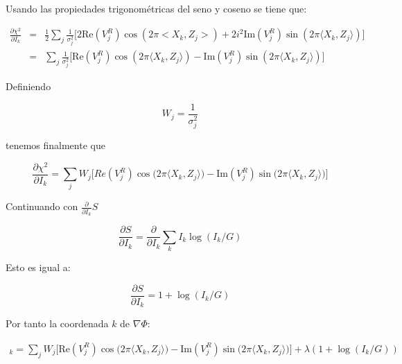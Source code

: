 Usando las propiedades trigonométricas del seno y coseno se tiene que:

\begin{eqnarray}
\frac{\partial\chi^{2}}{\partial I_{k}} & = & \frac{1}{2}\sum\limits_{j}\frac{1}{\sigma_{j}^{2}}\biggl[2\text{Re}(V_{j}^{R})\cos(2\pi <X_k,Z_j>)+2i^{2}\text{Im}(V_{j}^{R})\sin(2\pi \langle X_k,Z_j\rangle )\biggr] \\
                                      & = & \sum\limits_{j}\frac{1}{\sigma_{j}^{2}}\biggl[\text{Re}(V_{j}^{R}) \cos(2\pi\langle X_k,Z_j\rangle) - \text{Im}(V_{j}^{R})\sin(2\pi \langle X_k,Z_j\rangle)\biggr]
\end{eqnarray}

Definiendo 

\begin{equation}
W_{j} = \frac{1}{\sigma_{j}^{2}}
\end{equation}

tenemos finalmente que

\begin{equation}
\frac{\partial\chi^{2}}{\partial I_{k}} = \sum\limits_{j}W_{j}\biggl[Re(V_{j}^{R})\cos\bigl(2\pi \langle X_k,Z_j\rangle\bigr)-\text{Im}(V_{j}^{R})\sin\bigl(2\pi \langle X_k,Z_j\rangle\bigr)\biggr]
\end{equation}

Continuando con $\frac{\partial}{\partial I_{k}}S$

\begin{equation}
\frac{\partial S}{\partial I_{k}} = \frac{\partial}{\partial I_{k}}\sum\limits_{k}I_{k}\log(I_{k}/G)
\end{equation}

Esto es igual a:


\begin{equation}
\frac{\partial S}{\partial I_{k}} = 1+\log(I_{k}/G)
\end{equation}


Por tanto la coordenada $k$ de $\nabla\Phi$:

\begin{multline}
[\nabla \Phi]_k = \sum\limits_{j}W_{j}\biggl[\text{Re}(V_{j}^{R})\cos\bigl(2\pi \langle X_k,Z_j \rangle\bigr)-\text{Im}(V_{j}^{R})\sin\bigl(2\pi \langle X_k,Z_j \rangle\bigr)\biggr] + 
\lambda(1 + \log(I_{k}/G))
\end{multline}
